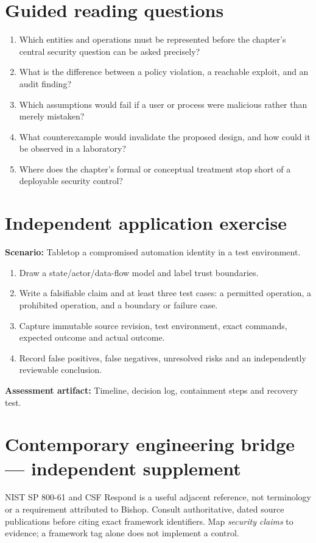 \documentclass[10pt,letterpaper]{article}
\begin{document}
\section{Guided reading questions}
\begin{enumerate}
\item Which entities and operations must be represented before the chapter's central security question can be asked precisely?
\item What is the difference between a policy violation, a reachable exploit, and an audit finding?
\item Which assumptions would fail if a user or process were malicious rather than merely mistaken?
\item What counterexample would invalidate the proposed design, and how could it be observed in a laboratory?
\item Where does the chapter's formal or conceptual treatment stop short of a deployable security control?
\end{enumerate}
\section{Independent application exercise}
\textbf{Scenario:} Tabletop a compromised automation identity in a test environment.
\begin{enumerate}
\item Draw a state/actor/data-flow model and label trust boundaries.
\item Write a falsifiable claim and at least three test cases: a permitted operation, a prohibited operation, and a boundary or failure case.
\item Capture immutable source revision, test environment, exact commands, expected outcome and actual outcome.
\item Record false positives, false negatives, unresolved risks and an independently reviewable conclusion.
\end{enumerate}
\textbf{Assessment artifact:} Timeline, decision log, containment steps and recovery test.
\section{Contemporary engineering bridge --- independent supplement}
NIST SP 800-61 and CSF Respond is a useful adjacent reference, not terminology or a requirement attributed to Bishop. Consult authoritative, dated source publications before citing exact framework identifiers. Map \emph{security claims} to evidence; a framework tag alone does not implement a control.
\end{document}
